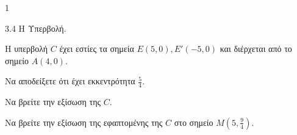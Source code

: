 \begin{ylh}{1}
    \item 3.4 Η Υπερβολή.
\end{ylh}
Η υπερβολή $C$ έχει εστίες τα σημεία $E(5,0), E'(-5,0)$ και διέρχεται από το σημείο $A(4,0)$.
\begin{alist}
\item Να αποδείξετε ότι έχει εκκεντρότητα $ \frac{5}{4} $. 
\item Να βρείτε την εξίσωση της $C$. 
\item Να βρείτε την εξίσωση της εφαπτομένης της $C$ στο σημείο $M(5, \frac{9}{4})$. 
\end{alist}
